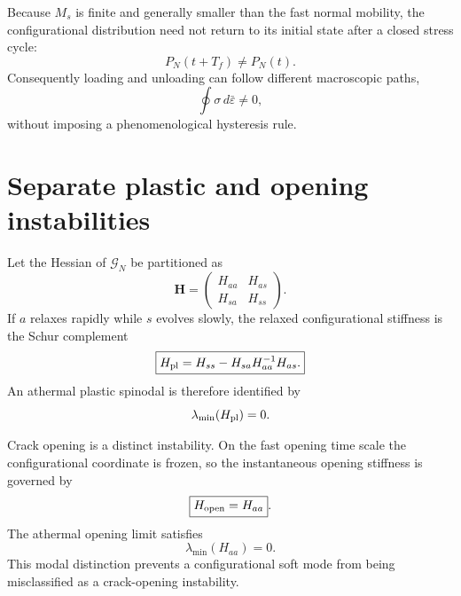 \documentclass[11pt]{article}
\begin{document}
Because $M_s$ is finite and generally smaller than the fast normal mobility, the configurational distribution need not return to its initial state after a closed stress cycle:
\begin{equation}
 P_N(t+T_f)\neq P_N(t).
\end{equation}
Consequently loading and unloading can follow different macroscopic paths,
\begin{equation}
 \oint \sigma\,d\bar\varepsilon\neq0,
\end{equation}
without imposing a phenomenological hysteresis rule.

\section{Separate plastic and opening instabilities}
Let the Hessian of $\mathcal G_N$ be partitioned as
\begin{equation}
 \bm H=
 \begin{pmatrix}
 H_{aa} & H_{as}\\
 H_{sa} & H_{ss}
 \end{pmatrix}.
\end{equation}
If $a$ relaxes rapidly while $s$ evolves slowly, the relaxed configurational stiffness is the Schur complement
\begin{equation}
 \boxed{
 H_{\rm pl}=H_{ss}-H_{sa}H_{aa}^{-1}H_{as}.
 }
 \label{eq:Hpl}
\end{equation}
An athermal plastic spinodal is therefore identified by
\begin{equation}
 \lambda_{\min}(H_{\rm pl})=0.
\end{equation}

Crack opening is a distinct instability. On the fast opening time scale the configurational coordinate is frozen, so the instantaneous opening stiffness is governed by
\begin{equation}
 \boxed{H_{\rm open}=H_{aa}}.
\end{equation}
The athermal opening limit satisfies
\begin{equation}
 \lambda_{\min}(H_{aa})=0.
\end{equation}
This modal distinction prevents a configurational soft mode from being misclassified as a crack-opening instability.
\end{document}
